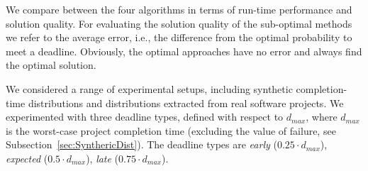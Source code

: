 \documentclass[letterpaper]{article} %
\newcommand{\astar}{\textsc{A*}\xspace}
\newcommand{\sampling}{\textsc{Sampling}\xspace}
\newcommand{\expectation}{\textsc{Expectation}\xspace}
\newcommand{\optapprox}{\textsc{OptApprox}\xspace}
\begin{document}

We compare between the four algorithms in terms of run-time performance and solution quality. For evaluating the solution quality of the sub-optimal methods we refer to the average error, i.e., the difference from the optimal probability to meet a deadline. Obviously, the optimal approaches have no error and always find the optimal solution.  

We considered a range of experimental setups, including synthetic completion-time distributions and distributions extracted from real software projects. 
We experimented with three deadline types, defined with respect to $d_{max}$, where $d_{max}$ is the worst-case project completion time (excluding the value of failure, see Subsection~\ref{sec:SynthericDist}). %
The deadline types are \emph{early} ($0.25{\cdot} d_{max}$), \emph{expected} ($0.5{\cdot} d_{max}$), \emph{late} ($0.75{\cdot} d_{max}$). 
\end{document}
